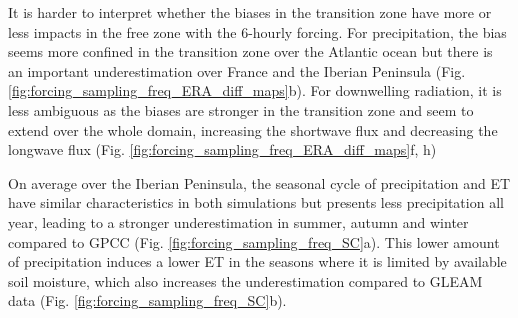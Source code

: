 It is harder to interpret whether the biases in the transition zone have more or less impacts in the free zone with the 6-hourly forcing. For precipitation, the bias seems more confined in the transition zone over the Atlantic ocean but there is an important underestimation over France and the Iberian Peninsula (Fig. \ref{fig:forcing_sampling_freq_ERA_diff_maps}b). For downwelling radiation, it is less ambiguous as the biases are stronger in the transition zone and seem to extend over the whole domain, increasing the shortwave flux and decreasing the longwave flux (Fig. \ref{fig:forcing_sampling_freq_ERA_diff_maps}f, h)

On average over the Iberian Peninsula, the seasonal cycle of precipitation and ET have similar characteristics in both simulations but \forcingsixh presents less precipitation all year, leading to a stronger underestimation in summer, autumn and winter compared to GPCC (Fig. \ref{fig:forcing_sampling_freq_SC}a). This lower amount of precipitation induces a lower ET in the seasons where it is limited by available soil moisture, which also increases the underestimation compared to GLEAM data (Fig. \ref{fig:forcing_sampling_freq_SC}b). 

